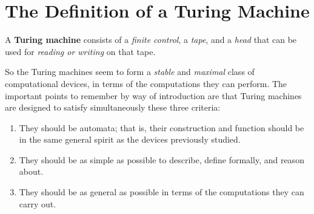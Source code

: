 \section{The Definition of a Turing Machine}
\label{sec:def-of-tm}

A \textbf{Turing machine} consists of a \textit{finite control}, a \textit{tape}, and a \textit{head} that can be used for \textit{reading or writing} on that tape.

So the Turing machines seem to form a \textit{stable} and \textit{maximal} class of computational devices, in terms of the computations they can perform. The important points to remember by way of introduction are that Turing machines are designed to satisfy simultaneously these three criteria:
\begin{enumerate}[label=(\alph*)]
  \item They should be automata; that is, their construction and function should be in the same general spirit as the devices previously studied.
  \item They should be as simple as possible to describe, define formally, and reason about.
  \item They should be as general as possible in terms of the computations they can carry out.
\end{enumerate}

